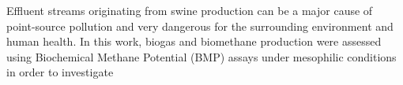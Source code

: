 Effluent streams originating from swine production can be a major cause of point-source pollution and very dangerous for the surrounding environment and human health. In this work, biogas and biomethane production were assessed using Biochemical Methane Potential (BMP) assays under mesophilic conditions in order to investigate 